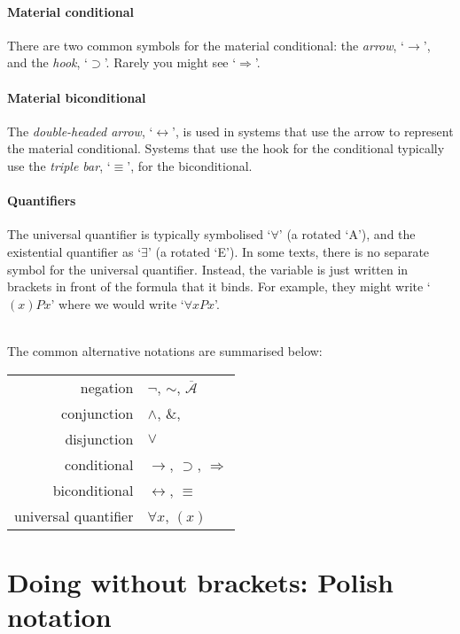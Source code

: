 \paragraph{Material conditional} There are two common symbols for the material conditional: the \emph{arrow}, `$\rightarrow$', and the \emph{hook}, `$\supset$'. Rarely you might see `$\Rightarrow$'.

\paragraph{Material biconditional} The \emph{double-headed arrow}, `$\leftrightarrow$', is used in systems that use the arrow to represent the material conditional. Systems that use the hook for the conditional typically use the \emph{triple bar}, `$\equiv$', for the biconditional.



\paragraph{Quantifiers} The universal quantifier is typically symbolised `$\forall$' (a rotated `\textsf{A}'), and the existential quantifier as `$\exists$' (a rotated `\textsf{E}'). In some texts, there is no separate symbol for the universal quantifier. Instead, the variable is just written in brackets in front of the formula that it binds. For example, they might write `$(x)Px$' where we would write `$\forall x Px$'.


\
\\The common alternative notations are summarised below:

\begin{center}
\begin{tabular}{rl} \toprule 
negation & $\neg$, $∼$, $\overline{\mathscr{A}}$\\
conjunction & $\wedge$, $\&$, {\scriptsize\textbullet}\\
disjunction & $\vee$\\
conditional & $\rightarrow$, $\supset$, $\Rightarrow$\\
biconditional & $\leftrightarrow$, $\equiv$\\
universal quantifier & $\forall x$, $(x)$\\ \bottomrule
\end{tabular}
\end{center}

\section*{Doing without brackets: Polish notation} \label{polish}


